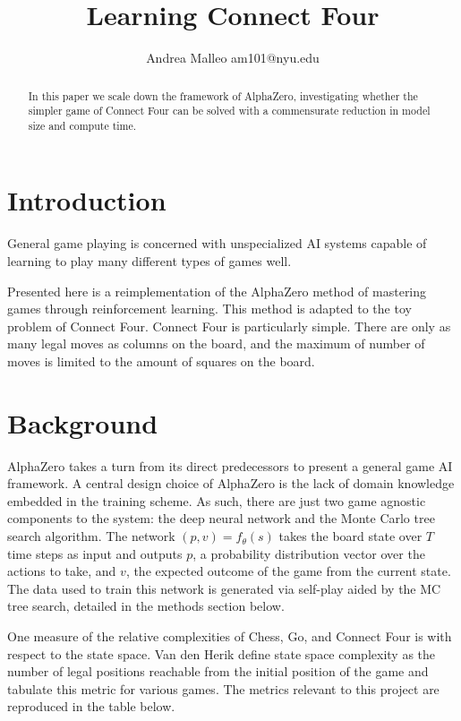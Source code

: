 \documentclass[twoside,11pt]{article}
\begin{document}
\title{Learning Connect Four}

\author{\name Andrea Malleo \email am101@nyu.edu \\}


\begin{abstract}%
In this paper we scale down the framework of AlphaZero,
investigating whether the simpler game of Connect Four can be solved with a commensurate
reduction in model size and compute time. 
\end{abstract}

  
 
\section{Introduction}
General game playing \cite{GeneralGamePlay} is concerned with unspecialized AI systems
capable of learning to play many different types of games well. 

Presented here is a reimplementation of the AlphaZero method of 
mastering games through reinforcement learning. This method is adapted to 
the toy problem of Connect Four. Connect Four is particularly simple. There are only
as many legal moves as columns on the board, and the maximum of number of moves 
is limited to the amount of squares on the board. 

\section{Background}
AlphaZero \cite{AlphaZero} takes a turn from its direct predecessors to present a general game AI framework.
A central design choice of AlphaZero is the lack of domain knowledge embedded in the training 
scheme. As such, there are just two game agnostic components to the system: the deep neural network and the
Monte Carlo tree search algorithm. The network $(p,v) = f_{\theta}(s)$
takes the board state over $T$ time steps as input and outputs $p$, a probability distribution vector
over the actions to take, and  $v$, the expected outcome of the game from the current state.
The data used to train this network is generated via self-play aided by the MC tree search, detailed in 
the methods section below. 


One measure of the relative complexities of Chess, Go, and Connect Four is with
respect to the state space. Van den Herik \cite{VANDENHERIK2002277}  define state space complexity as the number 
of legal positions reachable from the initial position of the game
and tabulate this metric for various games. The metrics relevant to this project are reproduced in the table
below.
\end{document}
